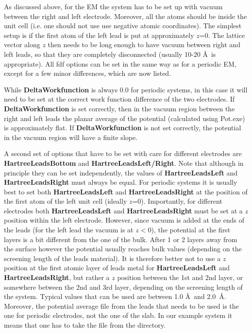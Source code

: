 \documentclass[11pt]{article}
\begin{document}
As discussed above, for the EM the system has to be set up with vacuum between the right and left electrode. Moreover, all the atoms should be inside the unit cell (i.e. one should not use use negative atomic coordinates). The simplest setup is if the first atom of the left lead is put at approximately $z$=0. The lattice vector along $z$ then needs to be long enough to have vacuum between right and left leads, so that they are completely disconnected (usually 10-20 \AA~is appropriate). All fdf options can be set in the same way as for a periodic EM, except for a few minor differences, which are now listed.

While {\bf DeltaWorkfunction} is always 0.0 for periodic systems, in this case it will need to be set at the correct work function difference of the two electrodes. If {\bf DeltaWorkfunction} is set correctly, then in the vacuum region between the right and left leads the planar average of the potential (calculated using Pot.exe) is approximately flat. If {\bf DeltaWorkfunction} is not set correctly, the potential in the vacuum region will have a finite slope. 

A second set of options that have to be set with care for different electrodes are {\bf HartreeLeadsBottom} and {\bf HartreeLeadsLeft/Right}.  Note that although in principle they can be set independently, the values of {\bf HartreeLeadsLeft} and {\bf HartreeLeadsRight} must always be equal. For periodic systems it is usually best to set both {\bf HartreeLeadsLeft} and {\bf HartreeLeadsRight} at the position of the first atom of the left unit cell (ideally $z$=0). Importantly, for different electrodes both {\bf HartreeLeadsLeft} and {\bf HartreeLeadsRight} must be set at a $z$ position within the left electrode. However, since vacuum is added at the ends of the leads (for the left lead the vacuum is at $z<0$), the potential at the first layers is a bit different from the one of the bulk. After 1 or 2 layers away from the surface however the potential usually reaches bulk values (depending on the screening length of the leads material). It is therefore better not to use a $z$ position at the first atomic layer of leads metal  for {\bf HartreeLeadsLeft} and {\bf HartreeLeadsRight}, but rather a $z$ position between the 1st and 2nd layer, or somewhere between the 2nd and 3rd layer, depending on the screening length of the system. Typical values that can be used are between 1.0 \AA~and 2.0~\AA. Moreover, the potential average file from the leads that needs to be used is the one for periodic electrodes, not the one of the slab. In our example system it means that one has to take the  file from the  directory.
\end{document}
